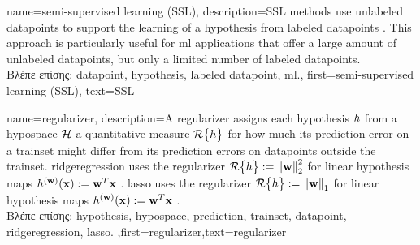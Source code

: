 {name={semi-supervised learning (SSL)}, 
	description={SSL methods use unlabeled \gls{datapoint}s
		to support the learning of a \gls{hypothesis} from \gls{labeled datapoint}s \cite{SemiSupervisedBook}. 
		This approach is particularly useful for \gls{ml} applications that offer a large amount of 
		unlabeled \gls{datapoint}s, but only a limited number of \gls{labeled datapoint}s.\\
	\foreignlanguage{greek}{Βλέπε επίσης:} \gls{datapoint}, \gls{hypothesis}, \gls{labeled datapoint}, \gls{ml}.}, 
	first={semi-supervised learning (SSL)},
	text={SSL} 
}
	
{name={regularizer}, 
	description={A regularizer 
		assigns each \gls{hypothesis} $h$ from a \gls{hypospace} $\mathcal{H}$ a quantitative 
		measure $\mathcal{R}\big\{ h \big\}$ for how much its \gls{prediction} error on a \gls{trainset} might 
		differ from its \gls{prediction} errors on \gls{datapoint}s outside the \gls{trainset}. \Gls{ridgeregression} 
		uses the regularizer $\mathcal{R}\big\{ h \big\} := \left\Vert {{\bf w}} \right\Vert_{2}^{2}$ for linear \gls{hypothesis} 
		maps $h^{({\bf w})}({\bf x}) := {\bf w}^{T} {\bf x}$ \cite[Ch. 3]{MLBasics}. 
		\Gls{lasso} uses the regularizer $\mathcal{R}\big\{ h \big\} := \left\Vert {{\bf w}} \right\Vert_{1}$ 
		for linear \gls{hypothesis} maps $h^{({\bf w})}({\bf x}) := {\bf w}^{T} {\bf x}$ \cite[Ch. 3]{MLBasics}.\\
		\foreignlanguage{greek}{Βλέπε επίσης:} \gls{hypothesis}, \gls{hypospace}, \gls{prediction}, \gls{trainset}, \gls{datapoint}, \gls{ridgeregression}, \gls{lasso}.
		},first={regularizer},text={regularizer} }
	
